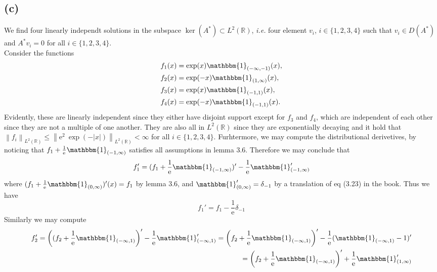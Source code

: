\documentclass[a4paper,11pt]{article}
\newcommand{\euler}[1]{\text{e}^{#1}}
\newcommand{\norm}[1]{\left\lVert #1 \right\rVert}
\newcommand{\abs}[1]{\left\lvert #1 \right\rvert}
\newcommand{\ie}{\emph{i.e.} }
\newcommand{\R}{\mathbb{R}}
\numberwithin{equation}{section}
\begin{document}
\subsection*{(c)}
We find four linearly independt solutions in the subspace $ \ker(A^*)\subset L^2(\R) $, \ie four element $ v_i $, $ i\in\{1,2,3,4\} $ such that $ v_i\in D(A^*) $ and $ A^*v_i=0 $ for all $ i\in\{1,2,3,4\} $.\\
Consider the functions \begin{equation}
\begin{aligned}
f_1(x)&=\exp(x)\mathbbm{1}_{(-\infty,-1)}(x),\\
f_2(x)&=\exp(-x)\mathbbm{1}_{(1,\infty)}(x),\\
f_3(x)&=\exp(x)\mathbbm{1}_{(-1,1)}(x),\\
f_4(x)&=\exp(-x)\mathbbm{1}_{(-1,1)}(x).
\end{aligned}
\end{equation}
Evidently, these are linearly independent since they either have disjoint support except for $ f_3 $ and $ f_4 $, which are independent of each other since they are not a multiple of one another. They are also all in $ L^2(\R) $ since they are exponentially decaying and it hold that $ \norm{f_i}_{L^2(\R)}\leq\norm{\euler{2}\ \exp(-\abs{x})}_{L^2(\R)}<\infty $ for all $ i\in\{1,2,3,4\} $. Furhtermore, we may compute the distributional derivetives, by noticing that $ f_1+\frac{1}{\euler{}}\mathbbm{1}_{(-1,\infty)} $ satisfies all assumptions in lemma 3.6. Therefore we may conclude that \begin{equation}
f_1'=(f_1+\frac{1}{\euler{}}\mathbbm{1}_{(-1,\infty)})'-\frac{1}{\euler{}}\mathbbm{1}_{(-1,\infty)}'
\end{equation}
where $ (f_1+\frac{1}{\euler{}}\mathbbm{1}_{(0,\infty)})'(x)=f_1 $ by lemma 3.6, and $ \mathbbm{1}_{(0,\infty)}'=\delta_{-1} $ by a translation of eq (3.23) in the book. Thus we have\begin{equation}
f_1'=f_1-\frac{1}{\euler{}}\delta_{-1}
\end{equation}
Similarly we may compute \begin{equation}
\begin{aligned}
f_2'=\left((f_2+\frac{1}{\euler{}}\mathbbm{1}_{(-\infty,1)}\right)'-\frac{1}{\euler{}}\mathbbm{1}_{(-\infty,1)}'=\left(f_2+\frac{1}{\euler{}}\mathbbm{1}_{(-\infty,1)}\right)'-\frac{1}{\euler{}}(\mathbbm{1}_{(-\infty,1)}-1)'\\=\left(f_2+\frac{1}{\euler{}}\mathbbm{1}_{(-\infty,1)}\right)'+\frac{1}{\euler{}}\mathbbm{1}_{(1,\infty)}'
\end{aligned}
\end{equation}
\end{document}
